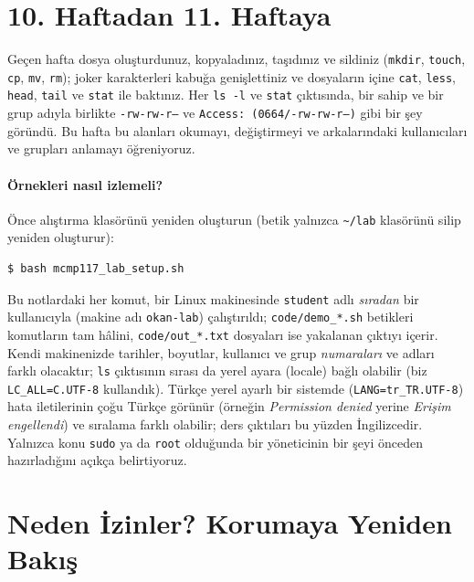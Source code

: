 \documentclass[11pt,a4paper]{article}
\newcommand{\cmd}[1]{\texttt{#1}}
\begin{document}
\setcounter{tocdepth}{1}
\tableofcontents

\section{10. Haftadan 11. Haftaya}

Geçen hafta dosya oluşturdunuz, kopyaladınız, taşıdınız ve sildiniz (\cmd{mkdir}, \cmd{touch}, \cmd{cp}, \cmd{mv}, \cmd{rm}); joker karakterleri kabuğa genişlettiniz ve dosyaların içine \cmd{cat}, \cmd{less}, \cmd{head}, \cmd{tail} ve \cmd{stat} ile baktınız. Her \cmd{ls -l} ve \cmd{stat} çıktısında, bir sahip ve bir grup adıyla birlikte \texttt{-rw-rw-r--} ve \texttt{Access: (0664/-rw-rw-r--)} gibi bir şey göründü. Bu hafta bu alanları okumayı, değiştirmeyi ve arkalarındaki kullanıcıları ve grupları anlamayı öğreniyoruz.

\paragraph{Örnekleri nasıl izlemeli?} Önce alıştırma klasörünü yeniden oluşturun (betik yalnızca \texttt{\textasciitilde/lab} klasörünü silip yeniden oluşturur):
\begin{lstlisting}[style=term]
$ bash mcmp117_lab_setup.sh
\end{lstlisting}
Bu notlardaki her komut, bir Linux makinesinde \texttt{student} adlı \emph{sıradan} bir kullanıcıyla (makine adı \texttt{okan-lab}) çalıştırıldı; \texttt{code/demo\_*.sh} betikleri komutların tam hâlini, \texttt{code/out\_*.txt} dosyaları ise yakalanan çıktıyı içerir. Kendi makinenizde tarihler, boyutlar, kullanıcı ve grup \emph{numaraları} ve adları farklı olacaktır; \cmd{ls} çıktısının sırası da yerel ayara (locale) bağlı olabilir (biz \texttt{LC\_ALL=C.UTF-8} kullandık). Türkçe yerel ayarlı bir sistemde (\texttt{LANG=tr\_TR.UTF-8}) hata iletilerinin çoğu Türkçe görünür (örneğin \emph{Permission denied} yerine \emph{Erişim engellendi}) ve sıralama farklı olabilir; ders çıktıları bu yüzden İngilizcedir. Yalnızca konu \cmd{sudo} ya da \texttt{root} olduğunda bir yöneticinin bir şeyi önceden hazırladığını açıkça belirtiyoruz.

\section{Neden İzinler? Korumaya Yeniden Bakış}
\end{document}
